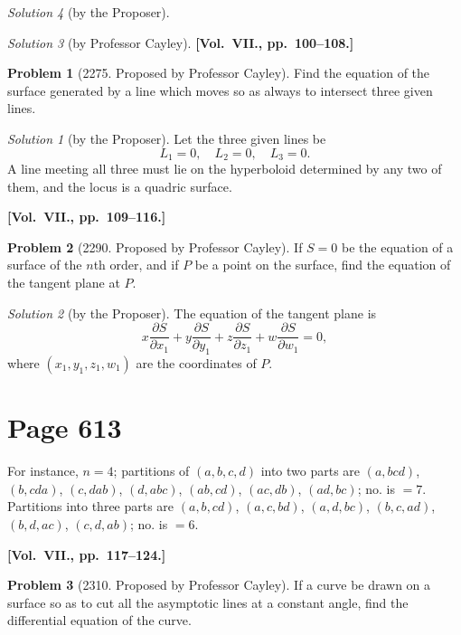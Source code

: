 \documentclass[12pt,a4paper]{article}
\theoremstyle{plain}
\theoremstyle{definition}
\newtheorem{problem}{Problem}
\theoremstyle{remark}
\newtheorem*{solution}{Solution}
\begin{document}
\begin{solution}[by the Proposer]
\begin{solution}[by Professor Cayley]
\medskip\noindent\textbf{[Vol.~VII., pp.~100--108.]}

\begin{problem}[2275. Proposed by Professor Cayley]
Find the equation of the surface generated by a line which moves so as always to intersect three given lines.
\end{problem}

\begin{solution}[by the Proposer]
Let the three given lines be
\[
L_1 = 0, \quad L_2 = 0, \quad L_3 = 0.
\]
A line meeting all three must lie on the hyperboloid determined by any two of them, and the locus is a quadric surface.
\end{solution}

\medskip\noindent\textbf{[Vol.~VII., pp.~109--116.]}

\begin{problem}[2290. Proposed by Professor Cayley]
If $S = 0$ be the equation of a surface of the $n$th order, and if $P$ be a point on the surface, find the equation of the tangent plane at $P$.
\end{problem}

\begin{solution}[by the Proposer]
The equation of the tangent plane is
\[
x\frac{\partial S}{\partial x_1} + y\frac{\partial S}{\partial y_1} + z\frac{\partial S}{\partial z_1} + w\frac{\partial S}{\partial w_1} = 0,
\]
where $(x_1, y_1, z_1, w_1)$ are the coordinates of $P$.
\end{solution}

\section*{Page 613}
\setcounter{page}{613}

For instance, $n = 4$; partitions of $(a, b, c, d)$ into two parts are $(a, bcd)$, $(b, cda)$, $(c, dab)$, $(d, abc)$, $(ab, cd)$, $(ac, db)$, $(ad, bc)$; no. is $= 7$. Partitions into three parts are $(a, b, cd)$, $(a, c, bd)$, $(a, d, bc)$, $(b, c, ad)$, $(b, d, ac)$, $(c, d, ab)$; no. is $= 6$.

\medskip\noindent\textbf{[Vol.~VII., pp.~117--124.]}

\begin{problem}[2310. Proposed by Professor Cayley]
If a curve be drawn on a surface so as to cut all the asymptotic lines at a constant angle, find the differential equation of the curve.
\end{problem}


\end{solution}
\end{solution}
\end{document}
